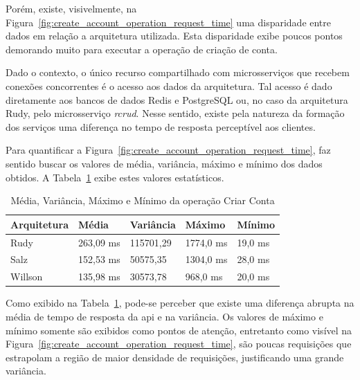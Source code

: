 Porém, existe, visivelmente, na Figura~\ref{fig:create_account_operation_request_time} uma disparidade entre dados em relação a arquitetura utilizada.
%
Esta disparidade exibe poucos pontos demorando muito para executar a operação de criação de conta.

Dado o contexto, o único recurso compartilhado com microsserviços que recebem conexões concorrentes é o acesso aos dados da arquitetura.
%
Tal acesso é dado diretamente aos bancos de dados Redis e PostgreSQL ou, no caso da arquitetura Rudy, pelo microsserviço \textit{rcrud}.
%
Nesse sentido, existe pela natureza da formação dos serviços uma diferença no tempo de resposta perceptível aos clientes.

Para quantificar a Figura~\ref{fig:create_account_operation_request_time}, faz sentido buscar os valores de média, variância, máximo e mínimo dos dados obtidos.
%
A Tabela~\ref{tab:create_account_operation_request_time} exibe estes valores estatísticos.

\begin{table}[htb!]
\centering
\begin{adjustbox}{max width=\textwidth}
\caption{Média, Variância, Máximo e Mínimo da operação Criar Conta}
\label{tab:create_account_operation_request_time}
\begin{tabular}{l|l|l|l|l}
\hline \hline
Arquitetura & Média     & Variância & Máximo    & Mínimo  \\ \hline \hline
Rudy        & 263,09 ms & 115701,29 & 1774,0 ms & 19,0 ms \\ \hline
Salz        & 152,53 ms & 50575,35  & 1304,0 ms & 28,0 ms \\ \hline
Willson     & 135,98 ms & 30573,78  & 968,0 ms  & 20,0 ms \\ \hline \hline
\end{tabular}

\end{adjustbox}
\end{table}

Como exibido na Tabela~\ref{tab:create_account_operation_request_time}, pode-se perceber que existe uma diferença abrupta na média de tempo de resposta da \ac{api} e na variância.
%
Os valores de máximo e mínimo somente são exibidos como pontos de atenção, entretanto como visível na Figura~\ref{fig:create_account_operation_request_time}, são poucas requisições que estrapolam a região de maior densidade de requisições, justificando uma grande variância.

